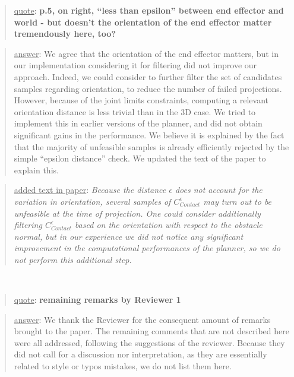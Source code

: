 \documentclass[a4paper]{article}
\newcommand{\done}[0]{}
\newcommand\quot[1]{\begin{quote} \underline{quote}: \textbf{#1}\end{quote}}
\newcommand\as[1]{\begin{quote} \underline{answer}: {#1}\end{quote} }
\newcommand\qt[1]{\begin{quote} \underline{added text in paper}: \textit{#1}\end{quote} \leavevmode \\ }
\begin{document}
\quot{p.5, on right, ``less than epsilon'' between end effector and world - but doesn’t the orientation of the end effector matter tremendously here, too?}
\as{
We agree that the orientation of the end effector matters, but in our implementation considering it for filtering did not improve our approach. Indeed, we could consider to further filter the set of candidates samples regarding orientation, to reduce the number of failed
projections. However, because of the joint limits constraints, computing a relevant orientation distance is less trivial than in the 3D case. We tried to implement this
in earlier versions of the planner, and did not obtain significant gains in the performance. We believe it is explained by the fact that the majority of unfeasible samples is already
efficiently rejected by the simple ``epsilon distance'' check. We updated the text of the paper to explain this.
}
\qt{Because the distance $\epsilon$ does not account for the variation in orientation, several samples of $ C_{Contact}^{\epsilon}$  may turn out to be unfeasible at the time of projection. One could consider additionally filtering $ C_{Contact}^{\epsilon}$ based on the orientation with respect to the obstacle normal, but in our experience we did not notice
any significant improvement in the computational performances of the planner, so we do not perform this additional step. }
\done

\quot{remaining remarks by Reviewer 1}
\as{We thank the Reviewer for the consequent amount of remarks brought to the paper. The remaining comments that are not described here were all addressed, following the suggestions of the reviewer. Because they did not call for a discussion nor interpretation, as they are essentially related to style or typos mistakes, we do not list them here.}\done
\end{document}
